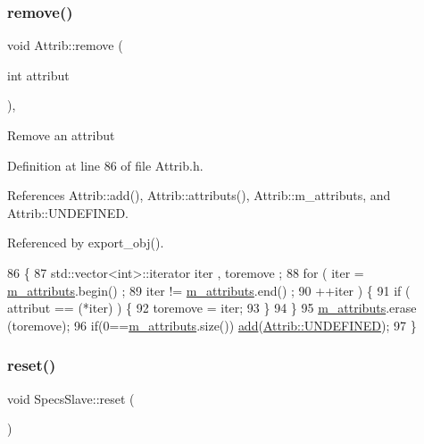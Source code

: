 \subsubsection{\texorpdfstring{remove()}{remove()}}
{\footnotesize\ttfamily void Attrib\+::remove (\begin{DoxyParamCaption}\item[{int}]{attribut }\end{DoxyParamCaption})\hspace{0.3cm}{\ttfamily [inline]}, {\ttfamily [inherited]}}

Remove an attribut 

Definition at line 86 of file Attrib.\+h.



References Attrib\+::add(), Attrib\+::attributs(), Attrib\+::m\+\_\+attributs, and Attrib\+::\+U\+N\+D\+E\+F\+I\+N\+ED.



Referenced by export\+\_\+obj().


\begin{DoxyCode}
86                                \{
87     std::vector<int>::iterator iter , toremove ;
88     \textcolor{keywordflow}{for} ( iter  = \hyperlink{classAttrib_ac4bd58a0cc6b38a3b711d609a3d3aacc}{m\_attributs}.begin() ;
89           iter != \hyperlink{classAttrib_ac4bd58a0cc6b38a3b711d609a3d3aacc}{m\_attributs}.end()   ;
90           ++iter ) \{
91       \textcolor{keywordflow}{if} ( attribut == (*iter) ) \{
92         toremove = iter;
93       \}
94     \}
95     \hyperlink{classAttrib_ac4bd58a0cc6b38a3b711d609a3d3aacc}{m\_attributs}.erase (toremove);
96     \textcolor{keywordflow}{if}(0==\hyperlink{classAttrib_ac4bd58a0cc6b38a3b711d609a3d3aacc}{m\_attributs}.size()) \hyperlink{classAttrib_a235f773af19c900264a190b00a3b4ad7}{add}(\hyperlink{classAttrib_a69e171d7cc6417835a5a306d3c764235a3a8da2ab97dda18aebab196fe4100531}{Attrib::UNDEFINED});
97   \}
\end{DoxyCode}
\mbox{\label{classSpecsSlave_a6c69baff5941cabed2947f547041bbeb}} 
\subsubsection{\texorpdfstring{reset()}{reset()}}
{\footnotesize\ttfamily void Specs\+Slave\+::reset (\begin{DoxyParamCaption}{ }\end{DoxyParamCaption})\hspace{0.3cm}{\ttfamily [virtual]}}


